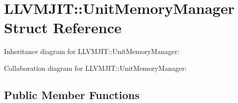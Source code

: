 \hypertarget{struct_l_l_v_m_j_i_t_1_1_unit_memory_manager}{}\section{L\+L\+V\+M\+J\+IT\+:\+:Unit\+Memory\+Manager Struct Reference}
\label{struct_l_l_v_m_j_i_t_1_1_unit_memory_manager}


Inheritance diagram for L\+L\+V\+M\+J\+IT\+:\+:Unit\+Memory\+Manager\+:


Collaboration diagram for L\+L\+V\+M\+J\+IT\+:\+:Unit\+Memory\+Manager\+:
\subsection*{Public Member Functions}
